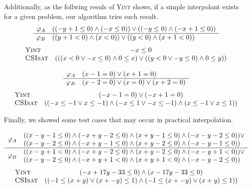 Additionally, as the follwing resuls of \textsc{Yint} shows, if a simple interpolant exists for a given problem, our algorithm tries such result.
\[\begin{array}{r l}
\varphi_A & ((-y+1 \leq 0) \wedge (-x \leq 0)) \vee ((-y \leq 0) \wedge (-x+1 \leq 0)) \\
\hline
\varphi_B & ((y+1<0) \wedge (x<0)) \vee ((y<0) \wedge (x+1<0))
\end{array}\]
\[\begin{array}{l c}
\text{\textsc{Yint}} & -x \leq 0 \\
\text{\textsc{CSIsat}} & (((x < 0 \vee -x \leq 0) \wedge 0 \leq x) \vee ((y < 0 \vee -y \leq 0) \wedge 0 \leq y))
\end{array}\]

\bigskip\centerline{}

\[\begin{array}{r l}
\varphi_A & (x-1=0) \vee (x+1=0) \\
\hline
\varphi_B & (x-2=0) \vee (x=0) \vee (x+2=0)
\end{array}\]
\[\begin{array}{l c}
\text{\textsc{Yint}} & (-x-1=0) \vee (-x+1=0) \\
\text{\textsc{CSIsat}} & ((-x \leq -1 \vee x \leq -1) \wedge (-x \leq 1 \vee - x \leq - 1) \wedge (x \leq - 1 \vee x \leq 1))
\end{array}\]

Finally, we showed some test cases that may occur in practical interpolation.

\[\begin{array}{r l}
\multirow{2}{*}{$\varphi_A$}
& ((x-y-1 \leq 0) \wedge (-x+y-2 \leq 0) \wedge (x+y-1 \leq 0) \wedge (-x-y-2 \leq 0)) \vee \\
& ((x-y-2 \leq 0) \wedge (-x+y-1 \leq 0) \wedge (x+y-2 \leq 0) \wedge (-x-y-1 \leq 0)) \\
\hline
\multirow{2}{*}{$\varphi_B$}
& ((x-y+1<0) \wedge (-x+y-2 \leq 0) \wedge (x+y-2 \leq 0) \wedge (-x-y+1<0)) \vee \\
& ((x-y-2 \leq 0) \wedge (-x+y+1<0) \wedge (x+y+1<0) \wedge (-x-y-2 \leq 0))
\end{array}\]
\[\begin{array}{l c}
\text{\textsc{Yint}} & (-x+17y-33 \leq 0) \wedge (x-17y-33 \leq 0) \\
\text{\textsc{CSIsat}} & ((-1 \leq (x + y) \vee (x + -y) \leq 1) \wedge (-1 \leq (x + -y) \vee (x + y) \leq 1))
\end{array}\]

